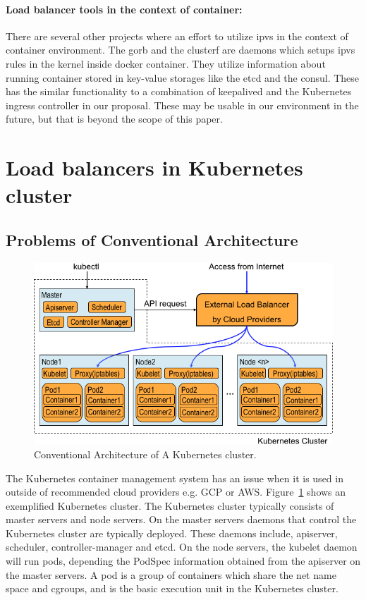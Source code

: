 \paragraph{\bf Load balancer tools in the context of container:}
There are several other projects where an effort to utilize ipvs in the context of container environment.
The gorb\cite{Sibiryov2015} and the clusterf\cite{Aaltodoc:http://urn.fi/URN:NBN:fi:aalto-201611025433} are daemons 
which setups ipvs rules in the kernel inside docker container. They utilize information about running container stored in key-value storages
like the etcd\cite{CoreOSEtcd} and the consul\cite{HashiCorpConsul}. 
These has the similar functionality to a combination of keepalived and the Kubernetes ingress controller in our proposal.
These may be usable in our environment in the future, but that is beyond the scope of this paper.

\section{Load balancers in Kubernetes cluster}\label{Load balancers in Kubernetes cluster}

\subsection{Problems of Conventional Architecture}

\begin{figure}
\includegraphics[width=\columnwidth]{Figs/K8sConventional}
\caption{Conventional Architecture of A Kubernetes cluster.}
\label{fig:K8sConventional}
\end{figure}

The Kubernetes container management system has an issue when it is used in outside of recommended cloud providers e.g. GCP or AWS.
Figure~\ref{fig:K8sConventional} shows an exemplified Kubernetes cluster.
The Kubernetes cluster typically consists of master servers and node servers.
On the master servers daemons that control the Kubernetes cluster are typically deployed. 
These daemons include, apiserver, scheduler, controller-manager and etcd. 
On the node servers, the kubelet daemon will run pods, depending the PodSpec information obtained from the apiserver on the master servers.
A pod is a group of containers which share the net name space and cgroups, 
and is the basic execution unit in the Kubernetes cluster.

